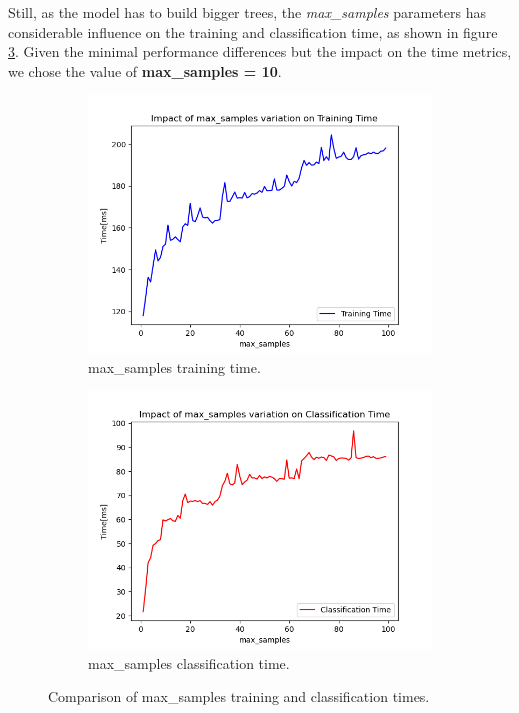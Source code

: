 \documentclass[futureinternet,article,submit,pdftex,moreauthors]{Definitions/mdpi}
\begin{document}
Still, as the model has to build bigger trees, the \textit{max\_samples} parameters has considerable influence on the training and classification time, as shown in figure \ref{fig:max_samples_time_comparison}.
Given the minimal performance differences but the impact on the time metrics, we chose the value of \textbf{max\_samples = 10}. 

\begin{figure}[H]
	\centering
	\begin{subfigure}{0.45\textwidth}
		\centering
		\includegraphics[width=\textwidth]{img/maxSamplesTrainingTime.png}
		\caption{max\_samples training time.}
		\label{fig:max_samples_training_time}
	\end{subfigure}
	\hfill
	\begin{subfigure}{0.45\textwidth}
		\centering
		\includegraphics[width=\textwidth]{img/maxSamplesClassificationTime.png}
		\caption{max\_samples classification time.}
		\label{fig:max_samples_classification_time}
	\end{subfigure}
	\caption{Comparison of max\_samples training and classification times.}
	\label{fig:max_samples_time_comparison}
\end{figure}
\end{document}
